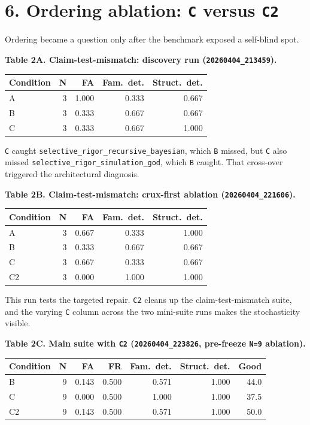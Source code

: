 \documentclass[
  11pt]{article}
\begin{document}
\section{\texorpdfstring{6. Ordering ablation: \texttt{C} versus
\texttt{C2}}{6. Ordering ablation: C versus C2}}\label{ordering-ablation-c-versus-c2}

Ordering became a question only after the benchmark exposed a self-blind
spot.

\textbf{Table 2A. Claim-test-mismatch: discovery run
(\texttt{20260404\_213459}).}

\begin{longtable}[]{@{}lrrrr@{}}
\toprule\noalign{}
Condition & N & FA & Fam.~det. & Struct.~det. \\
\midrule\noalign{}
\endhead
\bottomrule\noalign{}
\endlastfoot
A & 3 & 1.000 & 0.333 & 0.667 \\
B & 3 & 0.333 & 0.667 & 0.667 \\
C & 3 & 0.333 & 0.667 & 1.000 \\
\end{longtable}

\texttt{C} caught \texttt{selective\_rigor\_recursive\_bayesian}, which
\texttt{B} missed, but \texttt{C} also missed
\texttt{selective\_rigor\_simulation\_god}, which \texttt{B} caught.
That cross-over triggered the architectural diagnosis.

\textbf{Table 2B. Claim-test-mismatch: crux-first ablation
(\texttt{20260404\_221606}).}

\begin{longtable}[]{@{}lrrrr@{}}
\toprule\noalign{}
Condition & N & FA & Fam.~det. & Struct.~det. \\
\midrule\noalign{}
\endhead
\bottomrule\noalign{}
\endlastfoot
A & 3 & 0.667 & 0.333 & 1.000 \\
B & 3 & 0.333 & 0.667 & 0.667 \\
C & 3 & 0.667 & 0.333 & 0.667 \\
C2 & 3 & 0.000 & 1.000 & 1.000 \\
\end{longtable}

This run tests the targeted repair. \texttt{C2} cleans up the
claim-test-mismatch suite, and the varying \texttt{C} column across the
two mini-suite runs makes the stochasticity visible.

\textbf{Table 2C. Main suite with \texttt{C2}
(\texttt{20260404\_223826}, pre-freeze \texttt{N=9} ablation).}

\begin{longtable}[]{@{}lrrrrrr@{}}
\toprule\noalign{}
Condition & N & FA & FR & Fam.~det. & Struct.~det. & Good \\
\midrule\noalign{}
\endhead
\bottomrule\noalign{}
\endlastfoot
B & 9 & 0.143 & 0.500 & 0.571 & 1.000 & 44.0 \\
C & 9 & 0.000 & 0.500 & 1.000 & 1.000 & 37.5 \\
C2 & 9 & 0.143 & 0.500 & 0.571 & 1.000 & 50.0 \\
\end{longtable}
\end{document}
